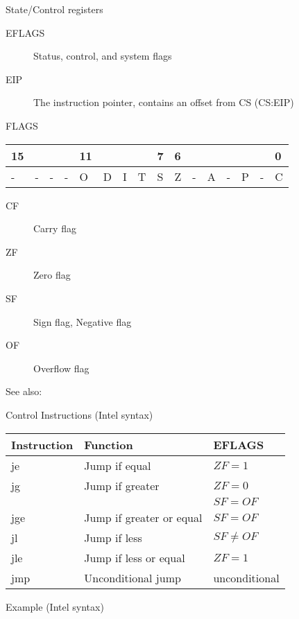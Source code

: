 \begin{frame}
  \begin{block}{State/Control registers}
    \begin{description}
    \item[EFLAGS] Status, control, and system flags
    \item[EIP] The instruction pointer, contains an offset from CS (CS:EIP)
    \end{description}
  \end{block}
  \begin{block}{FLAGS}
    \begin{tabular}{|l|l|l|l|l|l|l|l|l|l|l|l|l|l|l|l|}
      \hline
      15&&&&11&&&&7&6&&&&&&0\\\hline
      -&-&-&-&O&D&I&T&S&Z&-&A&-&P&-&C\\\hline
    \end{tabular}
    \begin{multicols}{2}
      \begin{description}
      \item[CF] Carry flag
      \item[ZF] Zero flag
      \item[SF] Sign flag, Negative flag
      \item[OF] Overflow flag
      \end{description}
    \end{multicols}
  \end{block}
\end{frame}

See also: 

\begin{frame}
  \begin{block}{Control Instructions \scriptsize{(Intel syntax)}}
    \begin{small}{\ttfamily
      \begin{tabular}{lll}
        \textbf{Instruction}&\textbf{Function}&\textbf{EFLAGS}\\\hline
        je&Jump if equal&$ZF=1$\\
        jg&Jump if greater&$ZF=0$\\
        &&$SF=OF$\\
        jge&Jump if greater or equal&$SF=OF$\\
        jl&Jump if less&$SF\ne{}OF$\\
        jle&Jump if less or equal&$ZF=1$\\
        jmp&Unconditional jump&unconditional
      \end{tabular}}
    \end{small}
  \end{block}
  \begin{block}{Example \scriptsize{(Intel syntax)}}
    \begin{center}
    \end{center}
  \end{block}
\end{frame}

